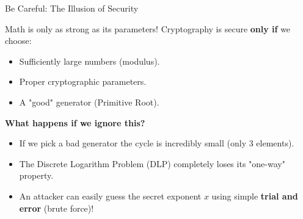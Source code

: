 \documentclass[aspectratio=169, 10pt]{beamer}
\begin{document}
\begin{frame}{Be Careful: The Illusion of Security}
    
    \begin{alertblock}{Math is only as strong as its parameters!}
        Cryptography is secure \textbf{only if} we choose:
        \begin{itemize}
            \item Sufficiently large numbers (modulus).
            \item Proper cryptographic parameters.
            \item A "good" generator (Primitive Root).
        \end{itemize}
    \end{alertblock}

    \vspace{0.4cm}
    \textbf{What happens if we ignore this?}
    \begin{itemize}
        \item If we pick a bad generator the cycle is incredibly small (only 3 elements).
        \vspace{0.2cm}
        \item The Discrete Logarithm Problem (DLP) completely loses its "one-way" property.
        \vspace{0.2cm}
        \item An attacker can easily guess the secret exponent $x$ using simple \textbf{trial and error} (brute force)!
    \end{itemize}
\end{frame}  
\end{document}
